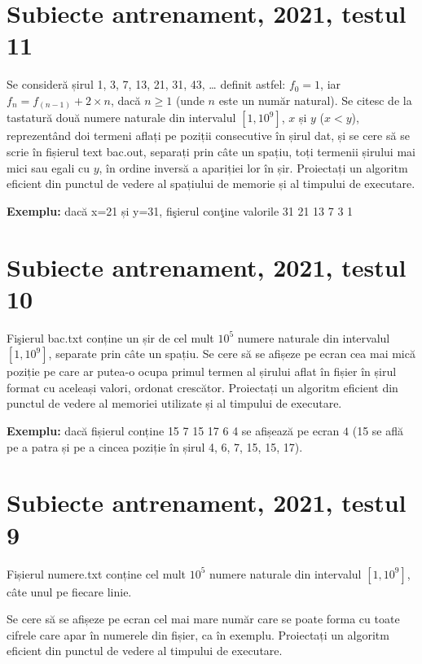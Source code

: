 \documentclass[10pt, a4paper]{article}
\newcommand{\highlight}[1]{{\ttfamily\color{red}#1}}
\begin{document}
\section{Subiecte antrenament, 2021, testul 11}
Se consideră șirul \highlight{1, 3, 7, 13, 21, 31, 43, \dots} definit astfel: \highlight{$f_0=1$}, iar \highlight{$f_n=f_(n-1) + 2 \times n$}, dacă \highlight{$n \geq 1$} (unde \highlight{$n$} este un număr natural). Se citesc de la tastatură două numere naturale din intervalul \highlight{$[1,10^9]$}, \highlight{$x$} și \highlight{$y$} (\highlight{$x<y$}), reprezentând doi termeni aflați pe poziții consecutive în șirul dat, și se cere să se scrie în fișierul text \highlight{bac.out}, separați prin câte un spațiu, toți termenii șirului mai mici sau egali cu \highlight{$y$}, în ordine inversă a apariției lor în șir. Proiectați un algoritm eficient din punctul de vedere al spațiului de memorie și al timpului de executare.

\vspace{0.2cm}
\noindent \textbf{Exemplu:} dacă \highlight{x=21} și \highlight{y=31}, fişierul conţine valorile \highlight{31 21 13 7 3 1}

\section{Subiecte antrenament, 2021, testul 10}
Fişierul \highlight{bac.txt} conține un șir de cel mult \highlight{$10^5$} numere naturale din intervalul \highlight{$[1,10^9]$}, separate prin câte un spațiu. Se cere să se afișeze pe ecran cea mai mică poziție pe care ar putea-o ocupa primul termen al șirului aflat în fișier în șirul format cu aceleași valori, ordonat crescător. Proiectați un algoritm eficient din punctul de vedere al memoriei utilizate și al timpului de executare.

\vspace{0.2cm}
\noindent \textbf{Exemplu:} dacă fișierul conține \highlight{15 7 15 17 6 4} se afișează pe ecran \highlight{$4$} (\highlight{15} se află pe a patra și pe a cincea poziție în șirul \highlight{4, 6, 7, 15, 15, 17}).

\section{Subiecte antrenament, 2021, testul 9}
Fișierul \highlight{numere.txt} conține cel mult \highlight{$10^5$} numere naturale din intervalul \highlight{$[1,10^9]$}, câte unul pe fiecare linie.

\vspace{0.2cm}
\noindent Se cere să se afișeze pe ecran cel mai mare număr care se poate forma cu toate cifrele care apar în numerele din fișier, ca în exemplu. Proiectați un algoritm eficient din punctul de vedere al timpului de executare.
\end{document}
